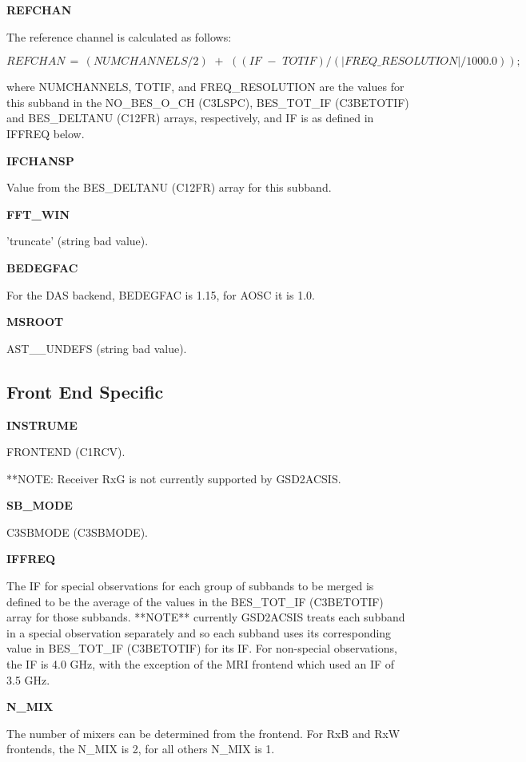 \documentclass[twoside,11pt,nolof]{starlink}
\providecommand{\frontend}{FRONTEND (C1RCV)}
\providecommand{\sbMode}{C3SBMODE (C3SBMODE)}
\providecommand{\BEChans}{NO\_BES\_O\_CH (C3LSPC)}
\providecommand{\totIFs}{BES\_TOT\_IF (C3BETOTIF)}
\providecommand{\freqRes}{BES\_DELTANU (C12FR)}
\begin{document}
\textbf{REFCHAN}

The reference channel is calculated as follows:
\begin{small}
\begin{equation}
REFCHAN \,=\, \left( NUMCHANNELS / 2 \right) \,\, + \,\, \left( \left( IF \,\, - \,\, TOTIF \right) / \left( |FREQ\_RESOLUTION| / 1000.0 \right) \right);
\end{equation}
\end{small}

where NUMCHANNELS, TOTIF, and FREQ\_RESOLUTION are the values for this subband in the \BEChans, \totIFs{} and \freqRes{} arrays, respectively, and IF is as defined in IFFREQ below.

\textbf{IFCHANSP}

Value from the \freqRes{} array for this subband.

\textbf{FFT\_WIN}

'truncate' (string bad value).

\textbf{BEDEGFAC}

For the DAS backend, BEDEGFAC is 1.15, for AOSC it is 1.0.

\textbf{MSROOT}

AST\_\_UNDEFS (string bad value).

\subsection{Front End Specific}

\textbf{INSTRUME}

\frontend{}.

**NOTE: Receiver RxG is not currently supported by GSD2ACSIS.

\textbf{SB\_MODE}

\sbMode.

\textbf{IFFREQ}

The IF for special observations for each group of subbands to be merged is defined to be the average of the values in the \totIFs{} array for those subbands.  **NOTE** currently GSD2ACSIS treats each subband in a special observation separately and so each subband uses its corresponding value in \totIFs{} for its IF.  For non-special observations, the IF is 4.0 GHz, with the exception of the MRI frontend which used an IF of 3.5 GHz.

\textbf{N\_MIX}

The number of mixers can be determined from the frontend.  For RxB and RxW frontends, the N\_MIX is 2, for all others N\_MIX is 1.
\end{document}
